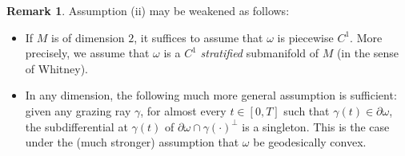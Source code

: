 \documentclass[JEP,XML,SOM,Unicode, NoEqCountersInSection,NoFloatCountersInSection,published]{cedram}
\theoremstyle{definition}
\newtheorem{remark}{Remark}
\begin{document}
\begin{remark}\label{remgen}
Assumption (ii) may be weakened as follows:
\begin{itemize}
\item If $M$ is of dimension $2$, it suffices to assume that $\omega$ is piecewise $C^1$. More precisely, we assume that $\omega$ is a $C^1$ \emph{stratified} submanifold of $M$ (in the sense of Whitney).
\item In any dimension, the following much more general assumption is sufficient: given any grazing ray $\gamma$, for almost every $t\in[0,T]$ such that $\gamma(t)\in\partial\omega$, the subdifferential at $\gamma(t)$ of $\partial\omega\cap\gamma(\cdot)^\perp$ is a singleton.
This is the case under the (much stronger) assumption that $\omega$ be geodesically convex.
\end{itemize}
\end{remark}
\end{document}
